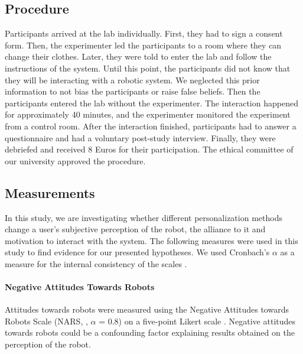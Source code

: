 \documentclass[twocolumn]{svjour3}          %
\begin{document}
\hypertarget{procedure}{%
\subsection{Procedure}\label{procedure}}

Participants arrived at the lab individually. First, they had to sign a
consent form. Then, the experimenter led the participants to a room
where they can change their clothes. Later, they were told to enter the
lab and follow the instructions of the system. Until this point, the
participants did not know that they will be interacting with a robotic
system. We neglected this prior information to not bias the participants
or raise false beliefs. Then the participants entered the lab without
the experimenter. The interaction happened for approximately 40 minutes,
and the experimenter monitored the experiment from a control room. After
the interaction finished, participants had to answer a questionnaire and
had a voluntary post-study interview. Finally, they were debriefed and received 8 Euros
for their participation. The ethical committee of our university
approved the procedure.

\hypertarget{measurements}{%
\subsection{Measurements}\label{measurements}}

In this study, we are investigating whether different personalization
methods change a user's subjective perception of the robot, the alliance
to it and motivation to interact with the system. The following measures
were used in this study to find evidence for our presented hypotheses.
We used Cronbach's \(\alpha\) as a measure for the internal consistency
of the scales \autocite{cronbach1951coefficient}.

\hypertarget{negative-attitudes-towards-robots}{%
\paragraph{Negative Attitudes Towards
Robots}\label{negative-attitudes-towards-robots}}

Attitudes towards robots were measured using the Negative Attitudes
towards Robots Scale (NARS, \eg{}, \(\alpha\) = 0.8) on a five-point
Likert scale \autocite{nomura2006experimental}. Negative attitudes
towards robots could be a confounding factor explaining results obtained
on the perception of the robot.
\end{document}
